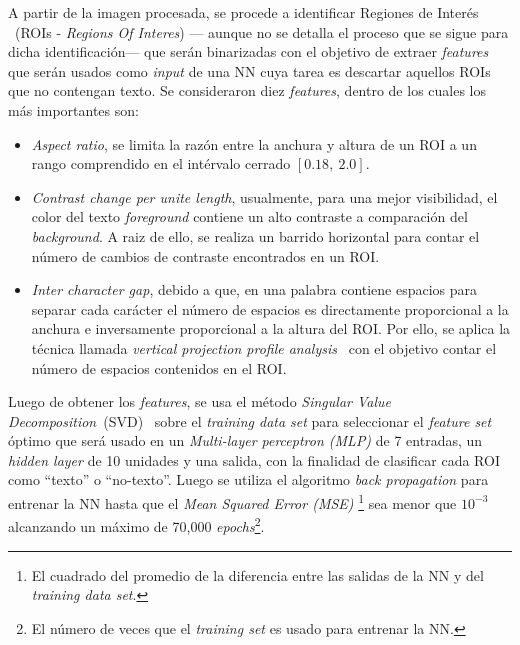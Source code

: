 A partir de la imagen procesada, se procede a identificar Regiones de Interés
~(ROIs - \textit{Regions Of Interes}) --- aunque no se detalla el proceso que se
sigue para dicha identificación--- que serán binarizadas con el objetivo de
extraer \textit{features} que serán usados como \textit{input} de una NN cuya
tarea es descartar aquellos ROIs que no contengan texto. Se consideraron diez
\textit{features}, dentro de los cuales los más importantes son:
\begin{itemize}
	\item \textit{Aspect ratio}, se limita la razón entre la anchura y altura de
un ROI a un rango comprendido en el intérvalo cerrado $[0.18, ~2.0]$.
	\item \textit{Contrast change per unite length}, usualmente, para una mejor
visibilidad, el color del texto \textit{foreground} contiene un alto contraste a
comparación del \textit{background}. A raiz de ello, se realiza un barrido
horizontal para contar el número de cambios de contraste encontrados en un ROI.
	\item \textit{Inter character gap}, debido a que, en una palabra contiene
espacios para separar cada carácter el número de espacios es directamente
proporcional a la anchura e inversamente proporcional a la altura del ROI. Por
ello, se aplica la técnica llamada \textit{vertical projection profile
analysis}~\cite{DIP:2008:RinBI} con el objetivo contar el número de espacios
contenidos en el ROI.
\end{itemize}

Luego de obtener los \textit{features}, se usa el método \textit{Singular Value
Decomposition}~(SVD)~\cite{SVD:web} sobre el \textit{training data set} para
seleccionar el \textit{feature set} óptimo que será usado en un
\textit{Multi-layer perceptron (MLP)} de 7 entradas, un \textit{hidden layer} de
10 unidades y una salida, con la finalidad de clasificar cada ROI como ``texto''
o ``no-texto''. Luego se utiliza el algoritmo \textit{back propagation} para
entrenar la NN hasta que el \textit{Mean Squared Error (MSE)} \footnote{El
cuadrado del promedio de la diferencia entre las salidas de la NN y del
\textit{training data set}.} sea menor que $10^{-3}$ alcanzando un máximo de
70,000 \textit{epochs}\footnote{El número de veces que el \textit{training set}
es usado para entrenar la NN.}.

